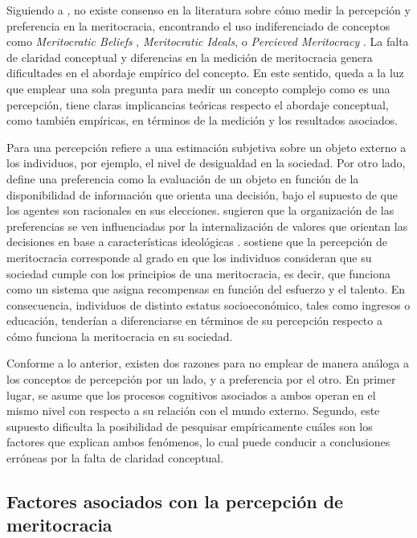 \documentclass[12pt]{article}
\begin{document}
Siguiendo a \citet{Castillo2018}, no existe consenso en la literatura sobre cómo medir la percepción y preferencia en la meritocracia, encontrando el uso indiferenciado de conceptos como \textit{Meritocratic Beliefs} \citep{Kunovich2007,McCoy2007,Ellis2017}, \textit{Meritocratic Ideals}, \citep{Reynolds2014} o \textit{Percieved Meritocracy} \citep{Xian2017}. La falta de claridad conceptual y diferencias en la medición de meritocracia genera dificultades en el abordaje empírico del concepto. En este sentido, queda a la luz que emplear una sola pregunta para medir un concepto complejo como es una percepción, tiene claras implicancias teóricas respecto el abordaje conceptual, como también empíricas, en términos de la medición y los resultados asociados. 

Para \cite{Burkhart2008} una percepción refiere a una estimación subjetiva sobre un objeto externo a los individuos, por ejemplo, el nivel de desigualdad en la sociedad. Por otro lado, \citet{Druckman2016a} define una preferencia como la evaluación de un objeto en función de la disponibilidad de información que orienta una decisión, bajo el supuesto de que los agentes son racionales en sus elecciones. \citet{Feldman2001} sugieren que la organización de las preferencias se ven influenciadas por la internalización de valores que orientan las decisiones en base a características ideológicas \citep{Kulin2013}. \citet{Garcia2001} sostiene que la percepción de meritocracia corresponde al grado en que los individuos consideran que su sociedad cumple con los principios de una meritocracia, es decir, que funciona como un sistema que asigna recompensas en función del esfuerzo y el talento. En consecuencia,  individuos de distinto estatus socioeconómico, tales como ingresos o educación, tenderían a diferenciarse en términos de su percepción respecto a cómo funciona la meritocracia en su sociedad. 

Conforme a lo anterior, existen dos razones para no emplear de manera análoga a los conceptos de percepción por un lado, y a preferencia por el otro. En primer lugar, se asume que los procesos cognitivos asociados a ambos operan en el mismo nivel con respecto a su relación con el mundo externo. Segundo, este supuesto dificulta la posibilidad de pesquisar empíricamente cuáles son los factores que explican ambos fenómenos, lo cual puede conducir a conclusiones erróneas por la falta de claridad conceptual. 
 
\subsection{Factores asociados con la percepción de meritocracia}
   
\end{document}

